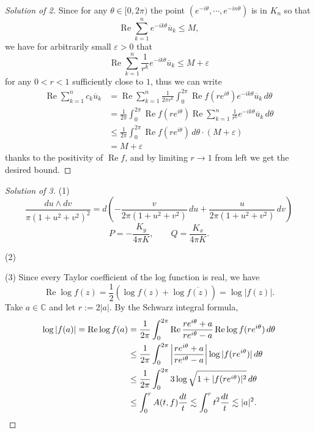 \documentclass[a4paper]{article}
\theoremstyle{definition}
\renewcommand{\Re}{\operatorname{Re}}
\newcommand{\C}{\mathbb{C}}
\newcommand{\e}{\varepsilon}
\renewcommand{\bar}{\overline}
\begin{document}
\begin{proof}[Solution of 2]
Since for any $\theta\in[0,2\pi)$ the point $(e^{-i\theta},\cdots,e^{-in\theta})$ is in $K_n$ so that
\[\Re\sum_{k=1}^ne^{-ik\theta}\bar u_k\le M,\]
we have for arbitrarily small $\e>0$ that
\[\Re\sum_{k=1}^n\frac1{r^k}e^{-ik\theta}\bar u_k\le M+\e\]
for any $0<r<1$ sufficiently close to $1$, thus we can write
\begin{align*}
\Re\sum_{k=1}^nc_k\bar u_k
&=\Re\sum_{k=1}^n\frac1{2\pi r^k}\int_0^{2\pi}\Re f(re^{i\theta})e^{-ik\theta}\bar u_k\,d\theta\\
&=\frac1{2\pi}\int_0^{2\pi}\Re f(re^{i\theta})\Re\sum_{k=1}^n\frac1{r^k}e^{-ik\theta}\bar u_k\,d\theta\\
&\le\frac1{2\pi}\int_0^{2\pi}\Re f(re^{i\theta})\,d\theta\cdot(M+\e)\\
&=M+\e
\end{align*}
thanks to the positivity of $\Re f$, and by limiting $r\to1$ from left we get the desired bound.
\end{proof}


\newpage
\begin{proof}[Solution of 3]
(1)
\[\frac{du\wedge dv}{\pi(1+u^2+v^2)^2}=d\left(-\frac v{2\pi(1+u^2+v^2)}\,du+\frac u{2\pi(1+u^2+v^2)}\,dv\right)\]
\[P=-\frac{K_y}{4\pi K},\qquad Q=\frac{K_x}{4\pi K}.\]

(2)

(3)
Since every Taylor coefficient of the log function is real, we have
\[\Re\log f(z)=\frac12(\log f(z)+\log\bar{f(z)})=\log|f(z)|.\]
Take $a\in\C$ and let $r:=2|a|$.
By the Schwarz integral formula,
\begin{align*}
\log|f(a)|=\Re\log f(a)&=\frac1{2\pi}\int_0^{2\pi}\Re\frac{re^{i\theta}+a}{re^{i\theta}-a}\Re\log f(re^{i\theta})\,d\theta\\
&\le\frac1{2\pi}\int_0^{2\pi}\left|\frac{re^{i\theta}+a}{re^{i\theta}-a}\right|\log|f(re^{i\theta})|\,d\theta\\
&\le\frac1{2\pi}\int_0^{2\pi}3\log\sqrt{1+|f(re^{i\theta})|^2}\,d\theta\\
&\le\int_0^rA(t,f)\frac{dt}t\lesssim\int_0^rt^2\frac{dt}t\lesssim|a|^2.\qedhere
\end{align*}


\end{proof}
\end{document}
